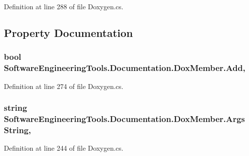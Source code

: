 Definition at line 288 of file Doxygen.\+cs.



\subsection{Property Documentation}
\hypertarget{class_software_engineering_tools_1_1_documentation_1_1_dox_member_ad343e6c7bcd05756ce2c32b737a67634}{
\subsubsection[{Add}]{\setlength{\rightskip}{0pt plus 5cm}bool Software\+Engineering\+Tools.\+Documentation.\+Dox\+Member.\+Add\hspace{0.3cm}{\ttfamily [get]}, {\ttfamily [set]}}}\label{class_software_engineering_tools_1_1_documentation_1_1_dox_member_ad343e6c7bcd05756ce2c32b737a67634}


Definition at line 274 of file Doxygen.\+cs.

\hypertarget{class_software_engineering_tools_1_1_documentation_1_1_dox_member_a832335a27473fb2cd348609854556035}{
\subsubsection[{Args\+String}]{\setlength{\rightskip}{0pt plus 5cm}string Software\+Engineering\+Tools.\+Documentation.\+Dox\+Member.\+Args\+String\hspace{0.3cm}{\ttfamily [get]}, {\ttfamily [set]}}}\label{class_software_engineering_tools_1_1_documentation_1_1_dox_member_a832335a27473fb2cd348609854556035}


Definition at line 244 of file Doxygen.\+cs.

